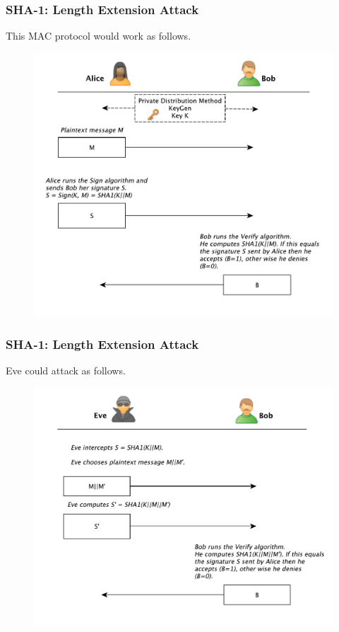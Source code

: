 \documentclass{beamer}
\newcommand{\<}{\langle}
\renewcommand{\>}{\rangle}
\begin{document}
\begin{frame}
\frametitle{SHA-1: Length Extension Attack}

This MAC protocol would work as follows.
\begin{figure}
\includegraphics[scale=.4]{IMG/LEA1}
\end{figure}
\end{frame}

\begin{frame}
\frametitle{SHA-1: Length Extension Attack}

Eve could attack as follows.
\begin{figure}
\includegraphics[scale=.45]{IMG/LEA2}
\end{figure}
\end{frame}
\end{document}
